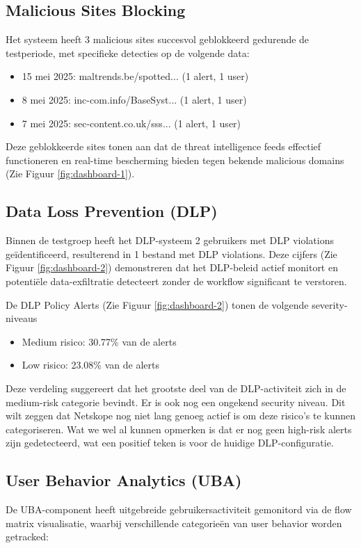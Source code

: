 \subsection{Malicious Sites Blocking}
Het systeem heeft 3 malicious sites succesvol geblokkeerd gedurende de testperiode, met specifieke detecties op de volgende data:
\begin{itemize}
    \item 15 mei 2025: maltrends.be/spotted... (1 alert, 1 user)
    \item 8 mei 2025: inc-com.info/BaseSyst... (1 alert, 1 user)
    \item 7 mei 2025: sec-content.co.uk/sss... (1 alert, 1 user)
\end{itemize}
Deze geblokkeerde sites tonen aan dat de threat intelligence feeds effectief functioneren en real-time bescherming bieden tegen bekende malicious domains (Zie Figuur \ref{fig:dashboard-1}).

\subsection{Data Loss Prevention (DLP)}
Binnen de testgroep heeft het DLP-systeem 2 gebruikers met DLP violations geïdentificeerd, resulterend in 1 bestand met DLP violations. Deze cijfers (Zie Figuur \ref{fig:dashboard-2}) demonstreren dat het DLP-beleid actief monitort en potentiële data-exfiltratie detecteert zonder de workflow significant te verstoren.

\vspace{2ex}

De DLP Policy Alerts (Zie Figuur \ref{fig:dashboard-2}) tonen de volgende severity-niveaus
\begin{itemize}
    \item Medium risico: 30.77\% van de alerts
    \item Low risico: 23.08\% van de alerts
\end{itemize}
Deze verdeling suggereert dat het grootste deel van de DLP-activiteit zich in de medium-risk categorie bevindt. Er is ook nog een ongekend security niveau. Dit wilt zeggen dat Netskope nog niet lang genoeg actief is om deze risico's te kunnen categoriseren. Wat we wel al kunnen opmerken is dat er nog geen high-risk alerts zijn gedetecteerd, wat een positief teken is voor de huidige DLP-configuratie.

\subsection{User Behavior Analytics (UBA)}
De UBA-component heeft uitgebreide gebruikersactiviteit gemonitord via de flow matrix visualisatie, waarbij verschillende categorieën van user behavior worden getracked:

